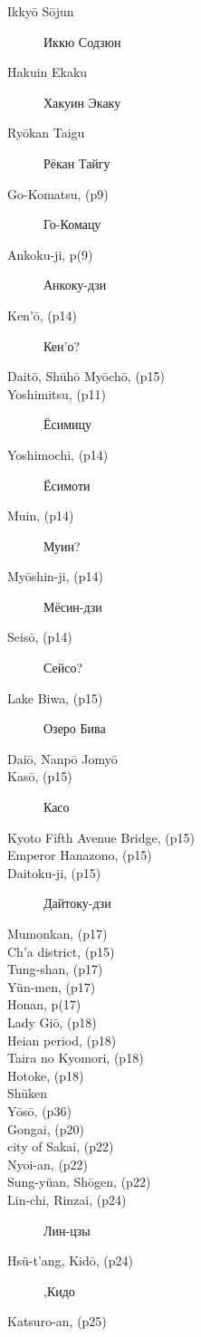 \begin{description}
\item[Ikky\=o S\=ojun]  Иккю Содзюн
\item[Hakuin Ekaku]  Хакуин Экаку
\item[Ry\=okan Taigu]  Рёкан Тайгу
\item[Go-Komatsu, (p9)] Го-Комацу
\item[Ankoku-ji, p(9)]  Анкоку-дзи
\item[Ken'\=o, (p14)]  Кен'о?
\item[Dait\=o, Sh\=uh\=o My\=och\=o, (p15)]   
\item[Yoshimitsu, (p11)]  Ёсимицу
\item[Yoshimochi, (p14)]  Ёсимоти
\item[Muin, (p14)] Муин? 
\item[My\=oshin-ji, (p14)] Мёсин-дзи
\item[Seis\=o, (p14)] Сейсо?
\item[Lake Biwa, (p15)]  Озеро Бива
\item[Dai\=o, Nanp\=o Jomy\=o]
\item[Kas\=o, (p15)] Касо  
\item[Kyoto Fifth Avenue Bridge, (p15)]
\item[Emperor Hanazono, (p15)]  
\item[Daitoku-ji, (p15)] Дайтоку-дзи
\item[Mumonkan, (p17)]  
\item[Ch'a district, (p15)]  
\item[Tung-shan, (p17)]  
\item[Y\"un-men, (p17)]  
\item[Honan, p(17)]
\item[Lady Gi\=o, (p18)]  
\item[Heian period, (p18)]  
\item[Taira no Kyomori, (p18)]  
\item[Hotoke, (p18)]  
\item[Sh\=uken]  
\item[Y\=os\=o, (p36)]  
\item[Gongai, (p20)]  
\item[city of Sakai, (p22)]  
\item[Nyoi-an, (p22)]  
\item[Sung-y\"uan, Sh\=ogen, (p22)]  
\item[Lin-chi, Rinzai, (p24)] Лин-цзы  
\item[Hs\"u-t'ang, Kid\=o, (p24)] ,Кидо  
\item[Katsuro-an, (p25)]  

\end{description}
